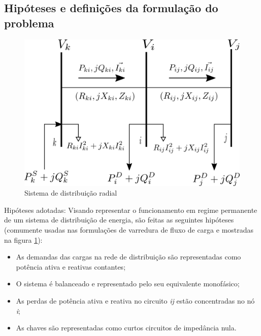 \subsection{Hipóteses e definições da formulação do problema}

\begin{figure}[H]
    \centering
    \includegraphics[scale = 1.2]{01_img/diagrama_nos.png}
    \caption{Sistema de distribuição radial}
    \label{fig:SDR}

\end{figure}

Hipóteses adotadas:
Visando representar o funcionamento em regime permanente de um sistema de distribuição de energia, são feitas as seguintes hipóteses (comumente usadas nas formulações de varredura de fluxo de carga \cite{Shirmohammadi1988ANetworks} e mostradas na figura \ref{fig:SDR}):

\begin{itemize}
    \item As demandas das cargas na rede de distribuição são representadas como potência ativa e reativas contantes;

    \item O sistema é balanceado e representado pelo seu equivalente monofásico;
    
    \item As perdas de potência ativa e reativa no circuito \textit{ij} estão concentradas no nó \textit{i};
    
    \item As chaves são representadas como curtos circuitos de impedância nula.
\end{itemize}

